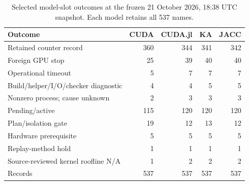 \begin{table}[t]
\centering\small
\caption{Selected model-slot outcomes at the frozen 21 October 2026, 18:38 UTC snapshot. Each model retains all 537 names.}
\label{tab:roofline-failures-selected}
\begin{tabular}{lrrrr}
\toprule
Outcome & CUDA & CUDA.jl & KA & JACC \\
\midrule
Retained counter record & 360 & 344 & 341 & 342 \\
Foreign GPU stop & 25 & 39 & 40 & 40 \\
Operational timeout & 5 & 7 & 7 & 7 \\
Build/helper/I/O/checker diagnostic & 4 & 4 & 5 & 5 \\
Nonzero process; cause unknown & 2 & 3 & 3 & 3 \\
Pending/active & 115 & 120 & 120 & 120 \\
Plan/isolation gate & 19 & 12 & 13 & 12 \\
Hardware prerequisite & 5 & 5 & 5 & 5 \\
Replay-method hold & 1 & 1 & 1 & 1 \\
Source-reviewed kernel roofline N/A & 1 & 2 & 2 & 2 \\
\midrule
Records & 537 & 537 & 537 & 537 \\
\bottomrule
\end{tabular}
\end{table}
